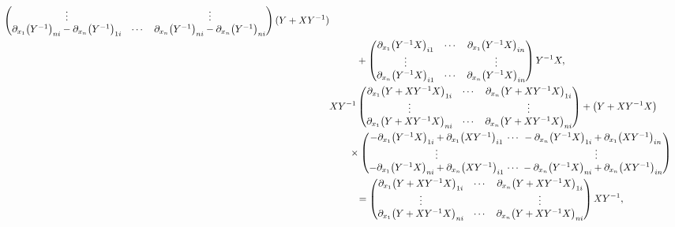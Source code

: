 \documentclass[pdftex]{sigma}
\numberwithin{equation}{section}
\begin{document}
\begin{align}
\begin{pmatrix}
\vdots & & \vdots \\
\partial_{x_1}\bigl(Y^{-1}\bigr)_{ni}-\partial_{x_n}\bigl(Y^{-1}\bigr)_{1i} & \cdots & \partial_{x_n}\bigl(Y^{-1}\bigr)_{ni}-\partial_{x_n}\bigl(Y^{-1}\bigr)_{ni}
\end{pmatrix}
(Y+XY^{-1})\nonumber \\
&\phantom{\qquad=}{}+
\begin{pmatrix}
\partial_{x_1}\bigl(Y^{-1}X\bigr)_{i1} & \cdots & \partial_{x_1}\bigl(Y^{-1}X\bigr)_{in} \\
\vdots & & \vdots \\
\partial_{x_n}\bigl(Y^{-1}X\bigr)_{i1} & \cdots & \partial_{x_n}\bigl(Y^{-1}X\bigr)_{in}
\end{pmatrix}
Y^{-1}X, \label{K4}
\\
& XY^{-1}
\begin{pmatrix}
\partial_{x_1}\bigl(Y+XY^{-1}X\bigr)_{1i} & \cdots & \partial_{x_n}\bigl(Y+XY^{-1}X\bigr)_{1i} \\
\vdots & & \vdots \\
\partial_{x_1}\bigl(Y+XY^{-1}X\bigr)_{ni} & \cdots & \partial_{x_n}\bigl(Y+XY^{-1}X\bigr)_{ni}
\end{pmatrix}+\bigl(Y+XY^{-1}X\bigr)\nonumber \\
&\qquad\times
\begin{pmatrix}
-\partial_{x_1}\bigl(Y^{-1}X\bigr)_{1i}+\partial_{x_1}\bigl(XY^{-1}\bigr)_{i1} & {\hspace*{-3mm}}\cdots & {\hspace*{-3mm}}-\partial_{x_n}\bigl(Y^{-1}X\bigr)_{1i}+\partial_{x_1}\bigl(XY^{-1}\bigr)_{in} \\
\vdots & & \vdots \\
-\partial_{x_1}\bigl(Y^{-1}X\bigr)_{ni}+\partial_{x_n}\bigl(XY^{-1}\bigr)_{i1} & {\hspace*{-3mm}}\cdots & {\hspace*{-3mm}}-\partial_{x_n}\bigl(Y^{-1}X\bigr)_{ni}+\partial_{x_n}\bigl(XY^{-1}\bigr)_{in}
\end{pmatrix}\nonumber \\
&\phantom{\qquad+}{}=\begin{pmatrix}
\partial_{x_1}\bigl(Y+XY^{-1}X\bigr)_{1i} & \cdots & \partial_{x_n}\bigl(Y+XY^{-1}X\bigr)_{1i} \\
\vdots & & \vdots \\
\partial_{x_1}\bigl(Y+XY^{-1}X\bigr)_{ni} & \cdots & \partial_{x_n}\bigl(Y+XY^{-1}X\bigr)_{ni}
\end{pmatrix}
XY^{-1},\label{K5}
\\

\end{align}
\end{document}
